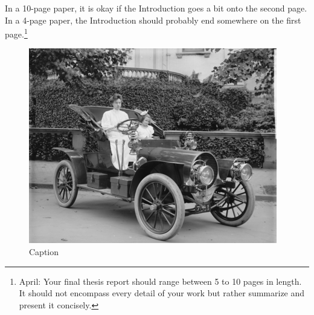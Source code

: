 In a 10-page paper, it is okay if the Introduction goes a bit onto the second page. 
In a 4-page paper, the Introduction should probably end somewhere on the first page.\footnote{April: Your final thesis report should range between 5 to 10 pages in length. It should not encompass every detail of your work but rather summarize and present it concisely.}

\begin{figure}
    \centering
    \includegraphics{figures/sample-franklin.png}
    \caption{Caption}
    \label{fig:enter-label}
\end{figure}